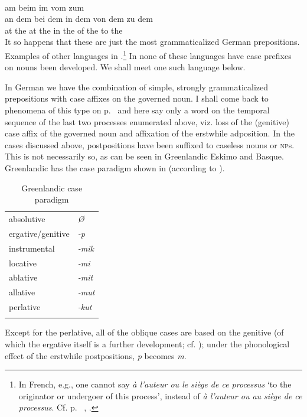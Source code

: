 \ea\label{ex:E57}
\langinfo{\LangGerm}{}{}\\
 \ea am  beim  im  vom  zum\\
\ex 
\gll an dem  bei dem  in dem  von dem  zu dem\\
  at the  at the   in the   of the  to the\\
\z
\z
\noindent It so happens that these are just the most grammaticalized German prepositions. Examples of other languages in \citealt[135--140]{Kahr1976}.\footnote{In French, e.g., one cannot say \textit{à l'auteur ou le siège de ce processus} ‘to the originator or undergoer of this process’, instead of \textit{à l'auteur ou au siège de ce processus}. Cf. p.~\pageref{ex:E106}\chkfn%
, .} In none of these languages have case prefixes on nouns been developed. We shall meet one such language below.

In German we have the combination of simple, strongly grammaticalized prepositions with case affixes on the governed noun. I shall come back to phenomena of this type on p.~\pageref{page99}\chk%
 and here say only a word on the temporal sequence of the last two processes enumerated above, viz. loss of the (genitive) case affix of the governed noun and affixation of the erstwhile adposition. In the cases discussed above, postpositions have been suffixed to caseless nouns or \textsc{np}s. This is not necessarily so, as can be seen in Greenlandic Eskimo and Basque. Greenlandic has the case paradigm shown in  (according to \citealt[310]{Woodbury1977}).

\begin{table}
\begin{tabular}{ll}
\lsptoprule

absolutive & \itshape Ø\\
ergative/genitive & \itshape {}-p\\
instrumental & \itshape {}-mik\\
locative & \itshape {}-mi\\
ablative & \itshape {}-mit\\
allative & \itshape {}-mut\\
perlative & \itshape {}-kut\\
\lspbottomrule
\end{tabular}
\caption{Greenlandic case paradigm} \label{tab:Greenlandic}
\end{table}

\noindent Except for the perlative, all of the oblique cases are based on the genitive (of which the ergative itself is a further development; cf. ); under the phonological effect of the erstwhile postpositions, \textit{p} becomes \textit{m}.


